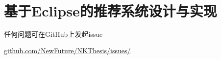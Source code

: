 \chapter{基于Eclipse的推荐系统设计与实现}

任何问题可在GitHub上发起issue 

\href{https://github.com/NewFuture/NKThesis/issues/new}{github.com/NewFuture/NKThesis/issues/}